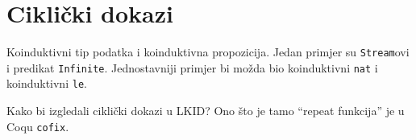 \chapter{Ciklički dokazi}\label{cha:cikliki-dokazi}
Koinduktivni tip podatka i koinduktivna propozicija. Jedan primjer su \texttt{Stream}ovi i predikat \texttt{Infinite}. Jednostavniji primjer bi možda bio koinduktivni \texttt{nat} i koinduktivni \texttt{le}.

Kako bi izgledali ciklički dokazi u LKID? Ono što je tamo ``repeat funkcija'' je u Coqu \texttt{cofix}.

